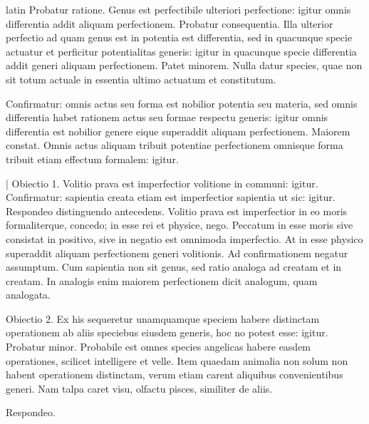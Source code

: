 \begin{otherlanguage*}{latin}
\pstart
 Probatur ratione. Genus est perfectibile ulteriori perfectione: igitur omnis differentia addit aliquam perfectionem. Probatur consequentia. Illa ulterior perfectio ad quam genus est in potentia est differentia, sed in quacunque specie actuatur et perficitur potentialitas generis: igitur in quacunque specie differentia addit generi aliquam perfectionem. Patet minorem. Nulla datur species, quae non sit totum actuale in essentia ultimo actuatum et constitutum. 
\pend

\pstart
 Confirmatur: omnis actus seu forma est nobilior potentia seu materia, sed omnis differentia habet rationem actus seu formae respectu generis: igitur omnis differentia est nobilior genere eique superaddit aliquam perfectionem. Maiorem constat. Omnis actus aliquam tribuit potentiae perfectionem omnisque forma tribuit etiam effectum formalem: igitur. 
\pend

\pstart
 \textnormal{|}   Obiectio 1. Volitio prava est imperfectior volitione in communi: igitur. Confirmatur: sapientia creata etiam est imperfectior sapientia ut sic: igitur. Respondeo distinguendo antecedens. Volitio prava est imperfectior in eo moris formaliterque, concedo; in esse rei et physice, nego. Peccatum in esse moris sive consistat in positivo, sive in negatio est omnimoda imperfectio. At in esse physico superaddit aliquam perfectionem generi volitionis. Ad confirmationem negatur assumptum. Cum sapientia non sit genus, sed ratio analoga ad creatam et in creatam. In analogis enim maiorem perfectionem dicit analogum, quam analogata. 
\pend

\pstart
 Obiectio 2. Ex his sequeretur unamquamque speciem habere distinctam operationem ab aliis speciebus eiusdem generis, hoc no potest esse: igitur. Probatur minor. Probabile est omnes species angelicas habere easdem operationes, scilicet intelligere et velle. Item quaedam animalia non solum non habent operationem distinctam, verum etiam carent aliquibus convenientibus generi. Nam talpa caret visu, olfactu pisces, similiter de aliis. 
\pend

\pstart
 Respondeo.  
\pend


\end{otherlanguage*}
